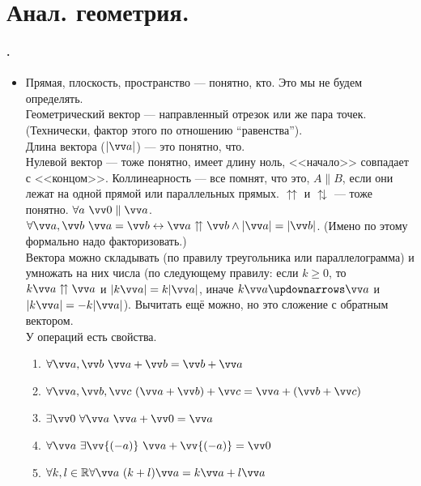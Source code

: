 \documentclass{article}
\let\vec\vv
\begin{document}
    \section{Анал. геометрия.}
    \paragraph{.}
    \begin{itemize}
        \item[]
        \begin{Comment}
            Прямая, плоскость, пространство --- понятно, кто. Это мы не будем определять.\\
            Геометрический вектор --- направленный отрезок или же пара точек. (Технически, фактор этого по отношению ``равенства'').\\
            Длина вектора ($|\vec a|$) --- это понятно, что.\\
            Нулевой вектор --- тоже понятно, имеет длину ноль, <<начало>> совпадает с <<концом>>.
            Коллинеарность --- все помнят, что это, $A\parallel B$, если они лежат на одной прямой или параллельных прямых. $\upuparrows$ и $\updownarrows$ --- тоже понятно.
            $\forall a~\vec0\parallel \vec a$.\\
            $\forall\vec a,\vec b~\vec a=\vec b\leftrightarrow\vec  a\upuparrows\vec  b\land|\vec a|=|\vec b|$. (Имено по этому формально надо факторизовать.)\\
            Вектора можно складывать (по правилу треугольника или параллелограмма) и умножать на них числа (по следующему правилу: если $k\geqslant0$, то $k\vec a\upuparrows\vec a$ и $|k\vec a|=k|\vec a|$, иначе $k\vec a\updownarrows\vec a$ и $|k\vec a|=-k|\vec a|$). Вычитать ещё можно, но это сложение с обратным вектором.\\
            У операций есть свойства.
            \begin{enumerate}[1.]
                \item $\forall\vec a,\vec b~\vec a+\vec b=\vec b+\vec a$
                \item $\forall\vec a,\vec b,\vec c~(\vec a+\vec b)+\vec c=\vec a+(\vec b+\vec c)$
                \item $\exists\vec0~\forall\vec a~\vec a+\vec0=\vec a$
                \item $\forall\vec a~\exists\vec{(-a)}~\vec a+\vec{(-a)}=\vec0$
                \item $\forall k,l\in\mathbb R\forall\vec a~(k+l)\vec a=k\vec a+l\vec a$

\end{enumerate}
\end{Comment}
\end{itemize}
\end{document}
